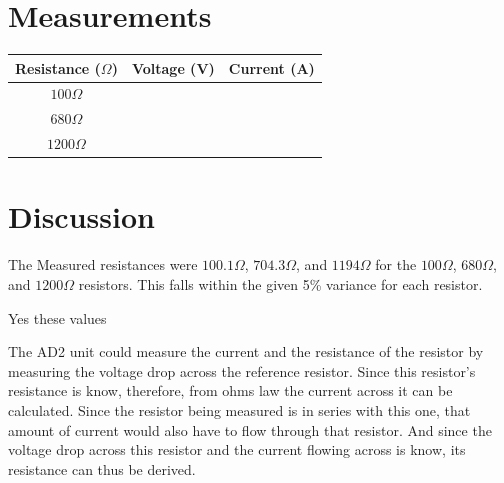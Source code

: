 \documentclass[12pt]{article}
\begin{document}
\section*{Measurements}
\begin{center}
\begin{tabular}{||c|c|c ||}
\hline
Resistance ($\Omega$) & Voltage (V) & Current (A)\\
\hline
\hline
$100\Omega$ & &\\
\hline
$680\Omega$ & &\\
\hline
$1200\Omega$ & &\\
\hline
\end{tabular}
\end{center}

\pagebreak
\section*{Discussion}
The Measured resistances were $100.1\Omega$, $704.3\Omega$, and $1194\Omega$ for the $100\Omega$, $680\Omega$, and $1200\Omega$ resistors. This falls within the given 5\% variance for each resistor.

Yes these values

The AD2 unit could measure the current and the resistance of the resistor by measuring the voltage drop across the reference resistor. Since this resistor's resistance is know, therefore, from ohms law the current across it can be calculated. Since the resistor being measured is in series with this one, that amount of current would also have to flow through that resistor. And since the voltage drop across this resistor and the current flowing across is know, its resistance can thus be derived. 
\pagebreak
\end{document}
